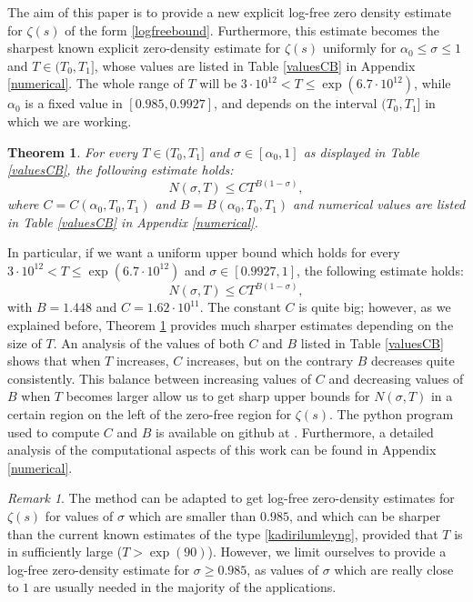 \documentclass[reqno]{amsart}
\newtheorem{theorem}{Theorem}[section]
\numberwithin{equation}{section}
\theoremstyle{remark}
\newtheorem*{remark}{Remark}
\begin{document}
The aim of this paper is to provide a new explicit log-free zero density estimate for $\zeta(s)$ of the form \eqref{logfreebound}. Furthermore, this estimate becomes the sharpest known explicit zero-density estimate for $\zeta(s)$ uniformly for $\alpha_0\le \sigma\le 1$ and $T\in(T_0,T_1]$, whose values are listed in Table \ref{valuesCB} in Appendix \ref{numerical}. The whole range of $T$ will be $3\cdot 10^{12}<T\le \exp(6.7\cdot 10^{12})$, while $\alpha_0$ is a fixed value in $[0.985,0.9927]$, and depends on the interval $(T_0,T_1]$ in which we are working.
\begin{theorem}\label{th1}
    For every $T\in(T_0,T_1]$ and $\sigma\in[\alpha_0,1]$ as displayed in Table \ref{valuesCB}, the following estimate holds:
    \[
    N(\sigma,T)\le C T^{B(1-\sigma)},
    \]
    where $C=C(\alpha_0,T_0,T_1)$ and $B=B(\alpha_0,T_0,T_1)$ and numerical values are listed in Table \ref{valuesCB} in Appendix \ref{numerical}.
\end{theorem}
In particular, if we want a uniform upper bound which holds for every $3\cdot 10^{12}<T\le \exp(6.7\cdot 10^{12})$ and $\sigma\in [0.9927,1]$, the following estimate holds:
\begin{equation*}
    N(\sigma,T)\le C T^{B(1-\sigma)},
\end{equation*}
with $B=1.448$ and $C=1.62\cdot 10^{11}$. The constant $C$ is quite big; however, as we explained before, Theorem \ref{th1} provides much sharper estimates depending on the size of $T$. An analysis of the values of both $C$ and $B$ listed in Table \ref{valuesCB} shows that when $T$ increases, $C$ increases, but on the contrary $B$ decreases quite consistently. This balance between increasing values of $C$ and decreasing values of $B$ when $T$ becomes larger allow us to get sharp upper bounds for $N(\sigma,T)$ in a certain region on the left of the zero-free region for $\zeta(s)$. The python program used to compute $C$ and $B$ is available on github at \cite{Bellotti_Log-free}. Furthermore, a detailed analysis of the computational aspects of this work can be found in Appendix \ref{numerical}.
\begin{remark}
    The method can be adapted to get log-free zero-density estimates for $\zeta(s)$ for values of $\sigma$ which are smaller than $0.985$, and which can be sharper than the current known estimates of the type \eqref{kadirilumleyng}, provided that $T$ is in sufficiently large ($T>\exp(90)$). However, we limit ourselves to provide a log-free zero-density estimate for $\sigma\ge 0.985$, as values of $\sigma $ which are really close to $1$ are usually needed in the majority of the applications.
\end{remark}
\end{document}
